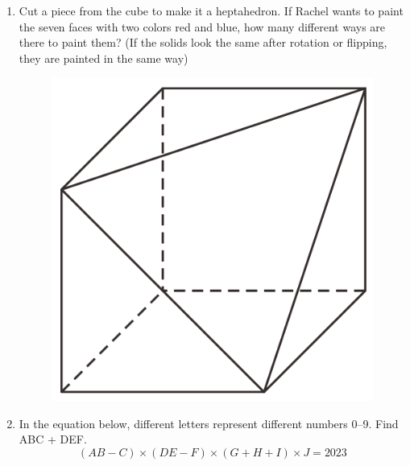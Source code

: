 \documentclass[12pt]{scrartcl}
\begin{document}
\begin{enumerate}[resume]
    \hrulefill \item Cut a piece from the cube to make it a heptahedron. If Rachel wants to paint the seven faces with two colors red and blue, how many different ways are there to paint them? (If the solids look the same after rotation or flipping, they are painted in the same way)
    \begin{figure}[h]
        \centering
        \includegraphics[scale=0.4]{StarGen/0Figure/wmi2023G6B-num5.png}
    \end{figure}

    \hrulefill \item In the equation below, different letters represent different numbers 0--9. Find ABC + DEF.
    \[ (AB - C) \times (DE - F) \times (G + H + I) \times J = 2023 \]


\end{enumerate}
\end{document}
